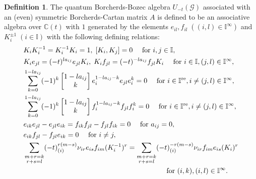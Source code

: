 \documentclass[12pt]{amsart}
\theoremstyle{definition}
\newtheorem{definition}[theorem]{Definition}
\numberwithin{equation}{section}
\begin{document}
\begin{definition}
    The quantum Borcherds-Bozec algebra  $ U_{-t}(\mathcal{G}) $ associated with an (even) symmetric Borcherds-Cartan matrix $ A $ is defined to be an associative algebra over $ \mathbb{C}(t) $ with $ 1 $ generated by the elements $ e_{il},f_{il} \;((i,l)\in \mathbb{I}^{\infty}) $ and $  K_i^{\pm1} \;(i \in \mathbb{I}) $
    with the following defining relations:
    \begin{align}
        & K_i K_i^{-1} = K_i^{-1}K_i = 1,\; [K_i,K_j] = 0 \quad \text{ for } i,j \in \mathbb{I}, \label{Quantum Relation 1}\\
        & K_i e_{jl} = (-t)^{la_{ij}} e_{jl}K_i,\; K_i f_{jl} = (-t)^{-la_{ij}} f_{jl}K_i \quad \text{ for } i\in \mathbb{I},(j,l) \in \mathbb{I}^{\infty},\label{Quantum Relation 2}\\
        & \sum\limits_{k=0}^{1-la_{ij}} (-1)^k \begin{bmatrix}
            1-la_{ij}  \\ k
        \end{bmatrix} e_{i}^{1-la_{ij}-k} e_{jl} e_i^k = 0 \quad \text{ for }  i \in \mathbb{I}^{\mathrm{re}}, i \neq (j,l) \in \mathbb{I}^{\infty}, \label{Quantum Relation 3}\\
        & \sum\limits_{k=0}^{1-la_{ij}} (-1)^k\begin{bmatrix}
            1-la_{ij}  \\ k
        \end{bmatrix} f_{i}^{1-la_{ij}-k} f_{jl} f_i^k = 0 \quad \text{ for }  i \in \mathbb{I}^{\mathrm{re}}, i \neq (j,l) \in \mathbb{I}^{\infty},\label{Quantum Relation 4}\\
        & e_{ik}e_{jl} - e_{jl}e_{ik} = f_{ik}f_{jl} - f_{jl}f_{ik} = 0 \quad \text{ for } a_{ij} = 0, \label{Quantum Relation 5}\\
        & e_{ik}f_{jl} - f_{jl}e_{ik} = 0 \quad \text{ for } i \neq j,\label{Quantum Relation 6}\\
        & \sum\limits_{\substack{m+r=k\\
        r+s=l}}  (-t)_{(i)}^{r(m-s)} \nu_{ir} e_{is} f_{im} (K_i^{-1})^r = \sum\limits_{\substack{m+r=k\\
        r+s=l}} (-t)_{(i)}^{-r(m-s)} \nu_{ir} f_{im} e_{is} (K_i)^r \label{Quantum Relation 7}\\
        & \quad\quad\quad\quad\quad\quad\quad\quad\quad\quad\quad\quad\quad\quad\quad\quad\quad\quad\quad\quad \notag \text{ for } (i,k),(i,l) \in \mathbb{I}^{\infty}.
    \end{align}
\end{definition}
\end{document}
